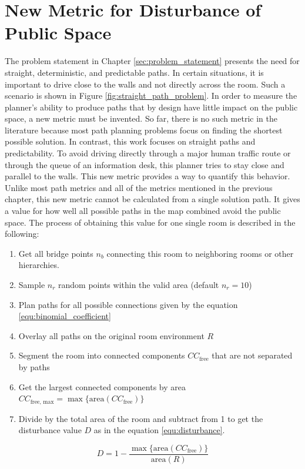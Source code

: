 \section{New Metric for Disturbance of Public Space}
\label{sec:new_metric}
The problem statement in Chapter \ref{sec:problem_statement} presents the need for straight, deterministic, and predictable paths. In certain situations, it is important to drive close to the walls and not directly across the room. Such a scenario is shown in Figure \ref{fig:straight_path_problem}. In order to measure the planner's ability to produce paths that by design have little impact on the public space, a new metric must be invented. So far, there is no such metric in the literature because most path planning problems focus on finding the shortest possible solution. In contrast, this work focuses on straight paths and predictability. To avoid driving directly through a major human traffic route or through the queue of an information desk, this planner tries to stay close and parallel to the walls. This new metric provides a way to quantify this behavior. Unlike most path metrics and all of the metrics mentioned in the previous chapter, this new metric cannot be calculated from a single solution path. It gives a value for how well all possible paths in the map combined avoid the public space. The process of obtaining this value for one single room is described in the following:

\begin{enumerate}
    \item Get all bridge points \(n_b\) connecting this room to neighboring rooms or other hierarchies.
\item Sample \(n_r\) random points within the valid area (default \(n_r = 10\))
    \item Plan paths for all possible connections given by the equation \ref{equ:binomial_coefficient}
    \item Overlay all paths on the original room environment \(R\)
    \item Segment the room into connected components \(CC_{\text{free}}\) that are not separated by paths
    \item Get the largest connected components by area \(CC_{\text{free, max}} = \max \{\text{area}(CC_{\text{free}})\}\)
    \item Divide by the total area of the room and subtract from 1 to get the disturbance value \(D\) as in the equation \ref{equ:disturbance}.
\end{enumerate}
\begin{equation}
\label{equ:disturbance}
    D = 1 - \frac{\max \{\text{{area}}(CC_{\text{{free}}})\}}{{\text{{area}}(R)}}
\end{equation}

